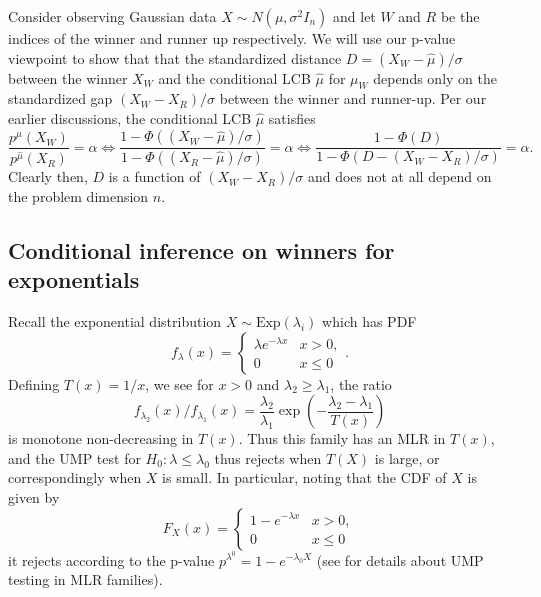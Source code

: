 \documentclass{article}
\begin{document}
\begin{appendix}
Consider observing Gaussian data $X \sim N(\mu, \sigma^2 I_n)$ and let $W$ and $R$ be the indices of the winner and runner up respectively. We will use our p-value viewpoint to show that that the standardized distance $D = (X_W - \hat{\mu})/\sigma$ between the winner $X_W$ and the conditional LCB $\hat{\mu}$ for $\mu_W$ depends only on the standardized gap $(X_W - X_R)/\sigma$ between the winner and runner-up. Per our earlier discussions, the conditional LCB $\hat{\mu}$ satisfies 
\begin{equation*}
    \frac{p^{\hat{\mu}}(X_W)}{p^{\hat{\mu}}(X_R)} = \alpha \iff \frac{1 - \Phi((X_W - \hat{\mu})/\sigma )}{1 - \Phi((X_R - \hat{\mu})/\sigma)} = \alpha \iff \frac{1 - \Phi(D)}{1 - \Phi(D - (X_W - X_R)/\sigma)} =\alpha.
\end{equation*}
Clearly then, $D$ is a function of $(X_W - X_R)/\sigma$ and does not at all depend on the problem dimension $n$. 

\subsection{Conditional inference on winners for exponentials}
\label{sec:exponential_winner_appdx}

Recall the exponential distribution $X \sim \text{Exp}(\lambda_i)$ which has PDF
\begin{equation*}
    f_{\lambda}(x) = 
\begin{cases} 
\lambda e^{-\lambda x} & x > 0, \\ 
0 & x \leq 0 
\end{cases}.
\end{equation*}
Defining $T(x) = 1/x$, we see for $x > 0$ and $\lambda_2 \geq \lambda_1$, the ratio  
\begin{equation*}
   f_{\lambda_2}(x)/f_{\lambda_1}(x) = \frac{\lambda_2}{\lambda_1} \exp\left( - \frac{\lambda_2 - \lambda_1}{T(x)}\right)
\end{equation*}
is monotone non-decreasing in $T(x)$. Thus this family has an MLR in $T(x)$, and the UMP test for $H_0 : \lambda \leq \lambda_0$ thus rejects when $T(X)$ is large, or correspondingly when $X$ is small. In particular, noting that the CDF of $X$ is given by 
\begin{equation*}
F_X(x) = 
\begin{cases} 
1 - e^{-\lambda x} & x > 0, \\ 
0 & x \leq 0 
\end{cases}
\end{equation*}
it rejects according to the p-value $p^{\lambda^0} = 1 - e^{-\lambda_0 X}$ (see  for details about UMP testing in MLR families).


\end{appendix}
\end{document}
